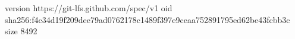 version https://git-lfs.github.com/spec/v1
oid sha256:f4c34d19f209dee79ad0762178c1489f397e9ceaa752891795ed62be43fcbb3c
size 8492

